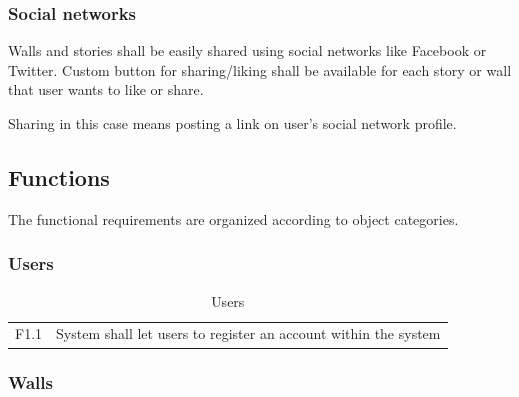 \documentclass[11pt]{book}
\begin{document}
\subsubsection{Social networks}\label{sec:req_social_networks}
Walls and stories shall be easily shared using social networks like Facebook or Twitter. Custom button for sharing/liking shall be available for each story or wall that user wants to like or share.

Sharing in this case means posting a link on user's social network profile.

\subsection{Functions}
The functional requirements are organized according to object categories.


\subsubsection{Users}

\begin{table}[H]
\centering
\begin{tabular}{ l  p{11cm} }
F1.1 & System shall let users to register an account within the system\\
\end{tabular}
\label{tab:req_users}
\caption{Users}
\end{table}

\subsubsection{Walls}
\end{document}
